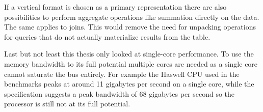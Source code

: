 If a vertical format is chosen as a primary representation there are also
possibilities to perform aggregate operations like summation directly on the
data. The same applies to joins. This would remove the need for unpacking
operations for queries that do not actually materialize results from the table.

Last but not least this thesis only looked at single-core performance. To use
the memory bandwidth to its full potential multiple cores are needed as a
single core cannot saturate the bus entirely. For example the Haswell CPU used
in the benchmarks peaks at around 11 gigabytes per second on a single core,
while the specification suggests a peak bandwidth of 68 gigabytes per second so
the processor is still not at its full potential.
